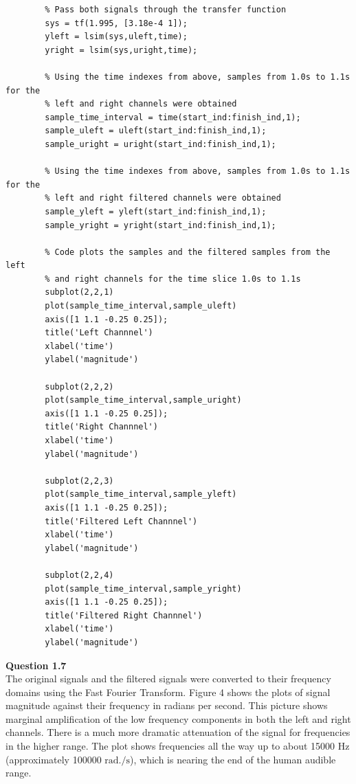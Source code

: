 \documentclass{article}
\begin{document}
    \begin{lstlisting}
	    % Pass both signals through the transfer function
	    sys = tf(1.995, [3.18e-4 1]);
	    yleft = lsim(sys,uleft,time);
	    yright = lsim(sys,uright,time);
	    
	    % Using the time indexes from above, samples from 1.0s to 1.1s for the
	    % left and right channels were obtained
	    sample_time_interval = time(start_ind:finish_ind,1);
	    sample_uleft = uleft(start_ind:finish_ind,1);
	    sample_uright = uright(start_ind:finish_ind,1);
	    
	    % Using the time indexes from above, samples from 1.0s to 1.1s for the
	    % left and right filtered channels were obtained
	    sample_yleft = yleft(start_ind:finish_ind,1);
	    sample_yright = yright(start_ind:finish_ind,1);
	    
	    % Code plots the samples and the filtered samples from the left 
	    % and right channels for the time slice 1.0s to 1.1s
	    subplot(2,2,1)
	    plot(sample_time_interval,sample_uleft)
	    axis([1 1.1 -0.25 0.25]);
	    title('Left Channnel')
	    xlabel('time')
	    ylabel('magnitude')
	    
	    subplot(2,2,2)
	    plot(sample_time_interval,sample_uright)
	    axis([1 1.1 -0.25 0.25]);
	    title('Right Channnel')
	    xlabel('time')
	    ylabel('magnitude')
	    
	    subplot(2,2,3)
	    plot(sample_time_interval,sample_yleft)
	    axis([1 1.1 -0.25 0.25]);
	    title('Filtered Left Channnel')
	    xlabel('time')
	    ylabel('magnitude')
	    
	    subplot(2,2,4)
	    plot(sample_time_interval,sample_yright)
	    axis([1 1.1 -0.25 0.25]);
	    title('Filtered Right Channnel')
	    xlabel('time')
	    ylabel('magnitude')
    \end{lstlisting}
	
	\newpage
	

	\textbf{Question 1.7}\\
	
	The original signals and the filtered signals were converted to their frequency domains using the Fast Fourier Transform. Figure 4 shows the plots of signal magnitude against their frequency in radians per second. This picture shows marginal amplification of the low frequency components in both the left and right channels. There is a much more dramatic attenuation of the signal for frequencies in the higher range. The plot shows frequencies all the way up to about 15000 $\si{\hertz}$ (approximately 100000 $\si{\radian.\per\second}$), which is nearing the end of the human audible range.\\
	
\end{document}
